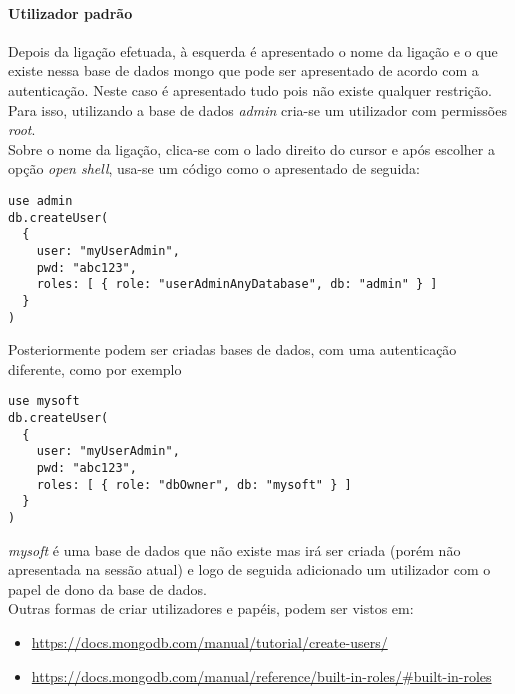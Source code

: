 \paragraph{Utilizador padrão}
Depois da ligação efetuada, à esquerda é apresentado o nome da ligação e o que existe nessa base de dados mongo que pode ser apresentado de acordo com a autenticação. Neste caso é apresentado tudo pois não existe qualquer restrição. Para isso, utilizando a base de dados \textit{admin} cria-se um utilizador com permissões \textit{root}.\newline \\
Sobre o nome da ligação, clica-se com o lado direito do cursor e após escolher a opção \textit{open shell}, usa-se um código como o apresentado de seguida:
\begin{lstlisting}[style=json]
use admin
db.createUser(
  {
    user: "myUserAdmin",
    pwd: "abc123",
    roles: [ { role: "userAdminAnyDatabase", db: "admin" } ]
  }
)
\end{lstlisting}
Posteriormente podem ser criadas bases de dados, com uma autenticação diferente, como por exemplo
\begin{lstlisting}[style=json]
use mysoft
db.createUser(
  {
    user: "myUserAdmin",
    pwd: "abc123",
    roles: [ { role: "dbOwner", db: "mysoft" } ]
  }
)
\end{lstlisting}
\textit{mysoft} é uma base de dados que não existe mas irá ser criada (porém não apresentada na sessão atual) e logo de seguida adicionado um utilizador com o papel de dono da base de dados.\newline \\
Outras formas de criar utilizadores e papéis, podem ser vistos em:
\begin{itemize}
\item \url{https://docs.mongodb.com/manual/tutorial/create-users/}
\item \url{https://docs.mongodb.com/manual/reference/built-in-roles/#built-in-roles}
\end{itemize}
